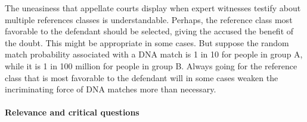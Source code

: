 \documentclass{article}
\begin{document}
The uneasiness that
appellate courts display when expert witnesses testify about multiple references classes is understandable. 
Perhaps, the reference class most favorable to the defendant should be selected, giving the accused the benefit of the doubt. This might be appropriate in some cases. But suppose the random match probability associated with a DNA match is 1 in 10 for people in group A, while it is 1 in 100 million for people in group B. Always going for the reference class that is most favorable to the defendant will in some cases weaken the incriminating force of DNA matches more than necessary. 



%


\paragraph{Relevance and critical questions}



\end{document}
